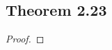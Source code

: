 \documentclass[../../main.tex]{subfiles}
\begin{document}
\subsection{Theorem 2.23}
\begin{wts}

\end{wts}
\begin{proof}

\end{proof}
\end{document}
